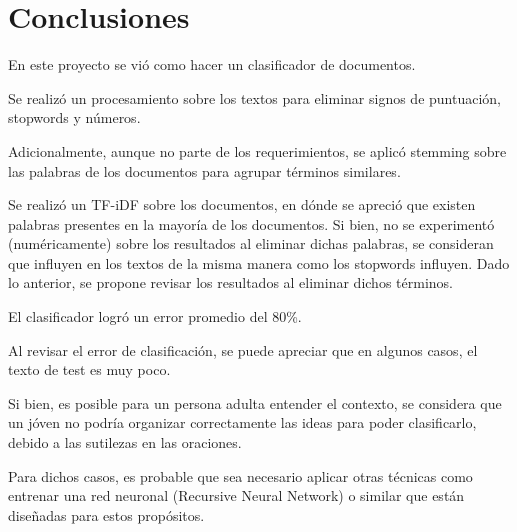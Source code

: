 \documentclass[11pt]{article}
\begin{document}
    \section{Conclusiones}\label{conclusiones}

En este proyecto se vió como hacer un clasificador de documentos.

Se realizó un procesamiento sobre los textos para eliminar signos de
puntuación, stopwords y números.

Adicionalmente, aunque no parte de los requerimientos, se aplicó
stemming sobre las palabras de los documentos para agrupar términos
similares.

Se realizó un TF-iDF sobre los documentos, en dónde se apreció que
existen palabras presentes en la mayoría de los documentos. Si bien, no
se experimentó (numéricamente) sobre los resultados al eliminar dichas
palabras, se consideran que influyen en los textos de la misma manera
como los stopwords influyen. Dado lo anterior, se propone revisar los
resultados al eliminar dichos términos.

El clasificador logró un error promedio del 80\%.

Al revisar el error de clasificación, se puede apreciar que en algunos
casos, el texto de test es muy poco.

Si bien, es posible para un persona adulta entender el contexto, se
considera que un jóven no podría organizar correctamente las ideas para
poder clasificarlo, debido a las sutilezas en las oraciones.

Para dichos casos, es probable que sea necesario aplicar otras técnicas
como entrenar una red neuronal (Recursive Neural Network) o similar que
están diseñadas para estos propósitos.


    
    
    
    
\end{document}
